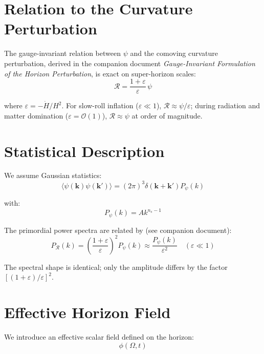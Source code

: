 \documentclass[12pt,a4paper]{article}
\begin{document}
\section{Relation to the Curvature Perturbation}

The gauge-invariant relation between $\psi$ and the comoving curvature perturbation, derived in the companion document \textit{Gauge-Invariant Formulation of the Horizon Perturbation}, is exact on super-horizon scales:
\begin{equation}
\mathcal{R} = \frac{1+\varepsilon}{\varepsilon}\,\psi \tag{18}
\end{equation}

where $\varepsilon = -\dot{H}/H^2$. For slow-roll inflation ($\varepsilon \ll 1$), $\mathcal{R} \approx \psi/\varepsilon$; during radiation and matter domination ($\varepsilon = \mathcal{O}(1)$), $\mathcal{R} \approx \psi$ at order of magnitude.

\section{Statistical Description}

We assume Gaussian statistics:
\begin{equation}
\langle\psi(\mathbf{k})\psi(\mathbf{k}')\rangle = (2\pi)^3\delta(\mathbf{k} + \mathbf{k}')P_\psi(k) \tag{19}
\end{equation}

with:
\begin{equation}
P_\psi(k) = Ak^{n_s - 1} \tag{20}
\end{equation}

The primordial power spectra are related by (see companion document):
\begin{equation}
P_\mathcal{R}(k) = \left(\frac{1+\varepsilon}{\varepsilon}\right)^2 P_\psi(k) \approx \frac{P_\psi(k)}{\varepsilon^2} \quad (\varepsilon \ll 1) \tag{21}
\end{equation}

The spectral shape is identical; only the amplitude differs by the factor $[(1+\varepsilon)/\varepsilon]^2$.

\section{Effective Horizon Field}

We introduce an effective scalar field defined on the horizon:
\begin{equation}
\phi(\Omega, t) \tag{22}
\end{equation}
\end{document}
